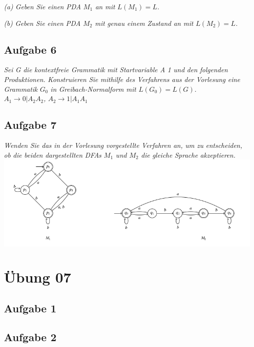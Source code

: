 \documentclass[a4paper]{article}
\begin{document}
\textit{(a) Geben Sie einen PDA $M_1$ an mit $L(M_1) = L$.}

\textit{(b) Geben Sie einen PDA $M_2$ mit genau einem Zustand an mit $L(M_2) = L$.}


\subsection{Aufgabe 6}
\textit{Sei G die kontextfreie Grammatik mit Startvariable A 1 und den folgenden Produktionen. Konstruieren Sie mithilfe des Verfahrens aus der Vorlesung eine Grammatik $G_0$ in Greibach-Normalform mit $L(G_0) = L(G)$.\\
$A_1\rightarrow 0 | A_2 A_2$, $A_2 \rightarrow 1 | A_1 A_1$}


\subsection{Aufgabe 7}
\textit{Wenden Sie das in der Vorlesung vorgestellte Verfahren an, um zu entscheiden, ob die beiden dargestellten DFAs $M_1$ und $M_2$ die gleiche Sprache akzeptieren.}
\includegraphics{Assets/ASK_uebung/u06_03.png}


\newpage
\section{Übung 07}
\subsection{Aufgabe 1}

\subsection{Aufgabe 2}
\end{document}
